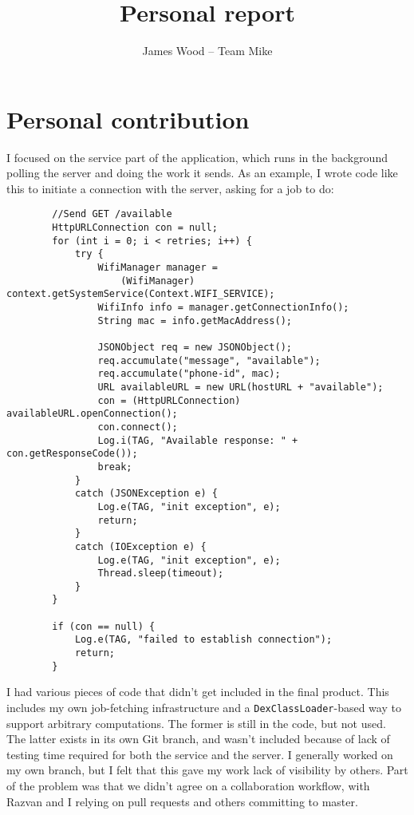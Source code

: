 \documentclass{article}
\begin{document}
\title{Personal report}
\author{James Wood -- Team Mike}
\maketitle

\section{Personal contribution}
I focused on the service part of the application, which runs in the background polling the server and doing the work it sends. As an example, I wrote code like this to initiate a connection with the server, asking for a job to do:

\begin{lstlisting}
        //Send GET /available
        HttpURLConnection con = null;
        for (int i = 0; i < retries; i++) {
            try {
                WifiManager manager =
                    (WifiManager) context.getSystemService(Context.WIFI_SERVICE);
                WifiInfo info = manager.getConnectionInfo();
                String mac = info.getMacAddress();

                JSONObject req = new JSONObject();
                req.accumulate("message", "available");
                req.accumulate("phone-id", mac);
                URL availableURL = new URL(hostURL + "available");
                con = (HttpURLConnection) availableURL.openConnection();
                con.connect();
                Log.i(TAG, "Available response: " + con.getResponseCode());
                break;
            }
            catch (JSONException e) {
                Log.e(TAG, "init exception", e);
                return;
            }
            catch (IOException e) {
                Log.e(TAG, "init exception", e);
                Thread.sleep(timeout);
            }
        }

        if (con == null) {
            Log.e(TAG, "failed to establish connection");
            return;
        }
\end{lstlisting}

I had various pieces of code that didn't get included in the final product. This includes my own job-fetching infrastructure and a \texttt{DexClassLoader}-based way to support arbitrary computations. The former is still in the code, but not used. The latter exists in its own Git branch, and wasn't included because of lack of testing time required for both the service and the server. I generally worked on my own branch, but I felt that this gave my work lack of visibility by others. Part of the problem was that we didn't agree on a collaboration workflow, with Razvan and I relying on pull requests and others committing to master.
\end{document}
